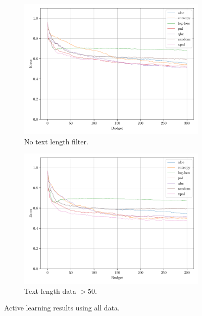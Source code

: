 \begin{figure}[ht]
    \centering
    \begin{subfigure}{0.49\textwidth}
        \includegraphics[width=\textwidth]{../img/plot_text_data_all_proper_vectorizer_test_results}
        \caption{No text length filter.}
        \label{fig:probal_all_proper_vect}
    \end{subfigure}
    \hfill
    \begin{subfigure}{0.49\textwidth}
        \includegraphics[width=\textwidth]{../img/plot_text_data_all_proper_vectorizer_50_st_filter_test_results}
        \caption{Text length data $>50$.}
        \label{fig:probal_all_proper_vect_50_st_filter}
    \end{subfigure}
    \caption{Active learning results using all data.}
\end{figure}


